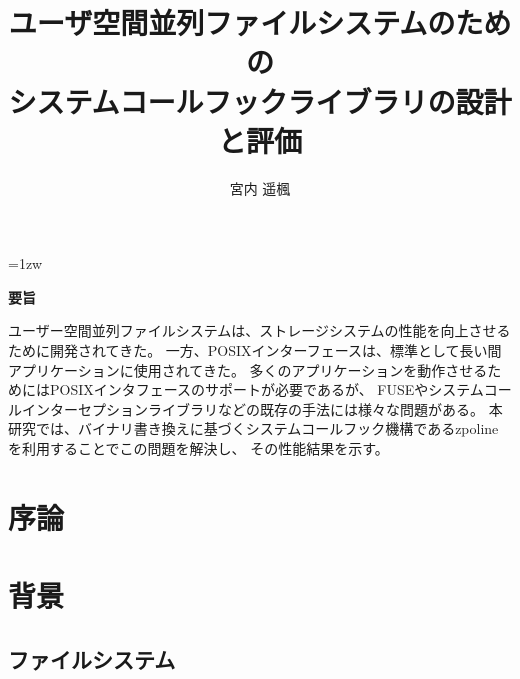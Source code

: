 \documentclass[a4paper,11pt]{jreport}
\title{ユーザ空間並列ファイルシステムのための\\システムコールフックライブラリの設計と評価}
\author{宮内 遥楓}
\begin{document}
\maketitle
\thispagestyle{empty}
\newpage

\thispagestyle{empty}
\vspace*{20pt plus 1fil}
\parindent=1zw
\noindent
\begin{center}
{\Large \bf 要旨}
\vspace{2cm}
\end{center}
ユーザー空間並列ファイルシステムは、ストレージシステムの性能を向上させるために開発されてきた。 
一方、POSIXインターフェースは、標準として長い間アプリケーションに使用されてきた。 
多くのアプリケーションを動作させるためにはPOSIXインタフェースのサポートが必要であるが、
FUSEやシステムコールインターセプションライブラリなどの既存の手法には様々な問題がある。
本研究では、バイナリ書き換えに基づくシステムコールフック機構であるzpolineを利用することでこの問題を解決し、
その性能結果を示す。

\par
\vspace{0pt plus 1fil}
\newpage

\tableofcontents
\listoffigures

\pagebreak \setcounter{page}{1}

\chapter{序論}


\chapter{背景}

\section{ファイルシステム}
\end{document}
